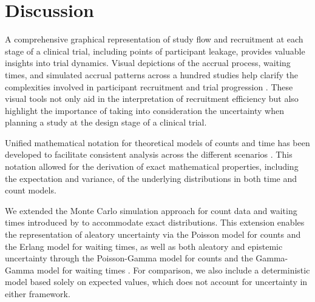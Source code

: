 

\chapter{Discussion}

A comprehensive graphical representation of study flow and recruitment at each stage of a clinical trial, including points of participant leakage, provides valuable insights into trial dynamics. Visual depictions of the accrual process, waiting times, and simulated accrual patterns across a hundred studies help clarify the complexities involved in participant recruitment and trial progression \citep{spiegelhalter2011visualizing}. These visual tools not only aid in the interpretation of recruitment efficiency but also highlight the importance of taking into consideration the uncertainty when planning a study at the design stage of a clinical trial.

Unified mathematical notation for theoretical models of counts and time has been developed to facilitate consistent analysis across the different scenarios \citep{anisimov2007modelling}. This notation allowed for the derivation of exact mathematical properties, including the expectation and variance, of the underlying distributions in both time and count models.

We extended the Monte Carlo simulation approach for count data and waiting times introduced by \cite{carter2004application} to accommodate exact distributions. This extension enables the representation of aleatory uncertainty via the Poisson model for counts and the Erlang model for waiting times, as well as both aleatory and epistemic uncertainty through the Poisson-Gamma model for counts and the Gamma-Gamma model for waiting times \citep{ohagan2006, anisimov2007modelling}. For comparison, we also include a deterministic model based solely on expected values, which does not account for uncertainty in either framework.

% 
% 



